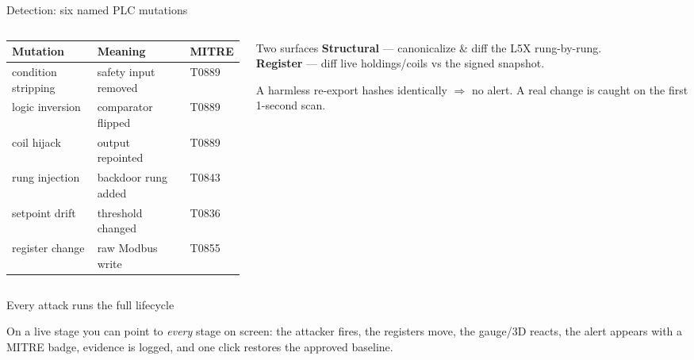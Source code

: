 \documentclass[aspectratio=169,11pt]{beamer}
\begin{document}
\begin{frame}{Detection: six named PLC mutations}
\begin{columns}[T]
\begin{column}{0.62\textwidth}
\footnotesize
\renewcommand{\arraystretch}{1.25}
\begin{tabularx}{\textwidth}{@{}l>{\raggedright\arraybackslash}X l@{}}
\toprule
\textbf{Mutation} & \textbf{Meaning} & \textbf{MITRE}\\ \midrule
condition stripping & safety input removed & T0889\\
logic inversion & comparator flipped & T0889\\
coil hijack & output repointed & T0889\\
rung injection & backdoor rung added & T0843\\
setpoint drift & threshold changed & T0836\\
register change & raw Modbus write & T0855\\
\bottomrule
\end{tabularx}
\end{column}
\begin{column}{0.38\textwidth}
\begin{block}{Two surfaces}
\small \textbf{Structural} --- canonicalize \& diff the L5X rung-by-rung.\\[3pt]
\textbf{Register} --- diff live holdings/coils vs the signed snapshot.
\end{block}
{\color{muted}\footnotesize A harmless re-export hashes identically $\Rightarrow$ no alert. A real change is caught on the first 1-second scan.}
\end{column}
\end{columns}
\end{frame}

\begin{frame}{Every attack runs the full lifecycle}
\begin{center}
\end{center}
\vspace{4pt}
{\small On a live stage you can point to \emph{every} stage on screen: the attacker fires, the
registers move, the gauge/3D reacts, the alert appears with a MITRE badge, evidence is logged,
and one click restores the approved baseline.}
\end{frame}
\end{document}
